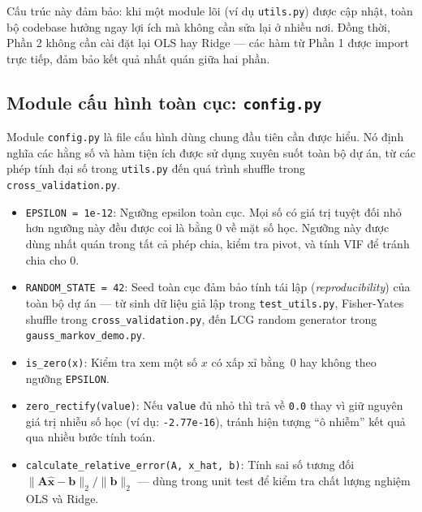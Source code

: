 Cấu trúc này đảm bảo: khi một module lõi (ví dụ \texttt{utils.py}) được cập nhật, toàn bộ codebase hưởng ngay lợi ích mà không cần sửa lại ở nhiều nơi. Đồng thời, Phần 2 không cần cài đặt lại OLS hay Ridge --- các hàm từ Phần 1 được import trực tiếp, đảm bảo kết quả nhất quán giữa hai phần.

\subsection{Module cấu hình toàn cục: \texttt{config.py}}

Module \texttt{config.py} là file cấu hình dùng chung đầu tiên cần được hiểu. Nó định nghĩa các hằng số và hàm tiện ích được sử dụng xuyên suốt toàn bộ dự án, từ các phép tính đại số trong \texttt{utils.py} đến quá trình shuffle trong \texttt{cross\_validation.py}.

\begin{itemize}
    \item \texttt{EPSILON = 1e-12}: Ngưỡng epsilon toàn cục. Mọi số có giá trị tuyệt đối nhỏ hơn ngưỡng này đều được coi là bằng 0 về mặt số học. Ngưỡng này được dùng nhất quán trong tất cả phép chia, kiểm tra pivot, và tính VIF để tránh chia cho 0.
    \item \texttt{RANDOM\_STATE = 42}: Seed toàn cục đảm bảo tính tái lập (\emph{reproducibility}) của toàn bộ dự án --- từ sinh dữ liệu giả lập trong \texttt{test\_utils.py}, Fisher-Yates shuffle trong \texttt{cross\_validation.py}, đến LCG random generator trong \texttt{gauss\_markov\_demo.py}.
    \item \texttt{is\_zero(x)}: Kiểm tra xem một số $x$ có xấp xỉ bằng~0 hay không theo ngưỡng \texttt{EPSILON}.
    \item \texttt{zero\_rectify(value)}: Nếu \texttt{value} đủ nhỏ thì trả về \texttt{0.0} thay vì giữ nguyên giá trị nhiễu số học (ví dụ: \texttt{-2.77e-16}), tránh hiện tượng ``ô nhiễm'' kết quả qua nhiều bước tính toán.
    \item \texttt{calculate\_relative\_error(A, x\_hat, b)}: Tính sai số tương đối $\|\mathbf{A}\hat{\mathbf{x}} - \mathbf{b}\|_2 / \|\mathbf{b}\|_2$ --- dùng trong unit test để kiểm tra chất lượng nghiệm OLS và Ridge.
\end{itemize}

